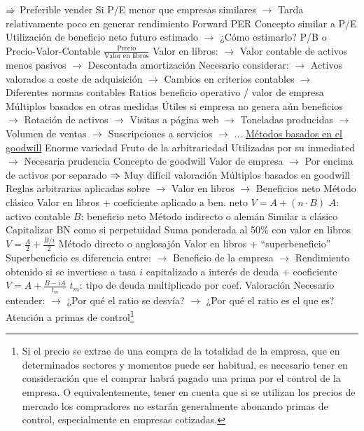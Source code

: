 \documentclass{nuevotema}
\begin{document}
\begin{esquemal}
				\4[] $\Rightarrow$ Preferible vender
				\4[] Si P/E menor que empresas similares
				\4[] $\to$ Tarda relativamente poco en generar rendimiento
			\3 Forward PER
				\4[] Concepto similar a P/E
				\4[] Utilización de beneficio neto futuro estimado
				\4[] $\to$ ¿Cómo estimarlo?
			\3 P/B o Precio-Valor-Contable
				\4 $\frac{\text{Precio}}{\text{Valor en libros}}$
				\4 Valor en libros:
				\4[] $\to$ Valor contable de activos menos pasivos
				\4[] $\to$ Descontada amortización
				\4 Necesario considerar:
				\4[] $\to$ Activos valorados a coste de adquisición
				\4[] $\to$ Cambios en criterios contables
				\4[] $\to$ Diferentes normas contables
			\3 Ratios beneficio operativo / valor de empresa
			\3 Múltiplos basados en otras medidas
				\4 Útiles si empresa no genera aún beneficios
				\4[] $\to$ Rotación de activos
				\4[] $\to$ Visitas a página web
				\4[] $\to$ Toneladas producidas
				\4[] $\to$ Volumen de ventas
				\4[] $\to$ Suscripciones a servicios
				\4[] $\to$ ...
			\3 \underline{Métodos basados en el goodwill}
				\4 Enorme variedad
				\4[] Fruto de la arbitrariedad
				\4[] Utilizadas por su inmediated
				\4[] $\to$ Necesaria prudencia
				\4 Concepto de goodwill
				\4[] Valor de empresa
				\4[] $\to$ Por encima de activos por separado
				\4[] $\Rightarrow$ Muy difícil valoración
				\4 Múltiplos basados en goodwill
				\4[] Reglas arbitrarias aplicadas sobre
				\4[] $\to$ Valor en libros
				\4[] $\to$ Beneficios neto
			\3 Método clásico
				\4[] Valor en libros + coeficiente aplicado a ben. neto
				\4[] $V = A + (n\cdot B)$
				\4[] $A$: activo contable
				\4[] $B$: beneficio neto
			\3 Método indirecto o alemán
				\4[] Similar a clásico
				\4[] Capitalizar BN como si perpetuidad
				\4[] Suma ponderada al 50\% con valor en libros
				\4[] $V = \frac{A}{2} + \frac{B/i}{2}$
			\3 Método directo o anglosajón
				\4[] Valor en libros + ``superbeneficio''
				\4[] Superbeneficio es diferencia entre:
				\4[] $\to$ Beneficio de la empresa
				\4[] $\to$ Rendimiento obtenido si se invertiese a tasa $i$
				\4[] \quad capitalizado a interés de deuda + coeficiente
				\4[] $V = A + \frac{B-iA}{t_m}$
				\4[] $t_m$: tipo de deuda multiplicado por coef.
			\3 Valoración
				\4[] Necesario entender:
				\4[] $\to$ ¿Por qué el ratio se desvía?
				\4[] $\to$ ¿Por qué el ratio es el que es?
				\4 Atención a primas de control\footnote{Si el precio se extrae de una compra de la totalidad de la empresa, que en determinados sectores y momentos puede ser habitual, es necesario tener en consideración que el comprar habrá pagado una prima por el control de la empresa. O equivalentemente, tener en cuenta que si se utilizan los precios de mercado los compradores no estarán generalmente abonando primas de control, especialmente en empresas cotizadas.}

\end{esquemal}
\end{document}
